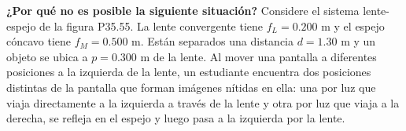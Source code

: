 \item \textbf{¿Por qué no es posible la siguiente situación?}
Considere el sistema lente-espejo de la figura P35.55. La lente convergente tiene $f_L = 0.200\text{ m}$ y el espejo cóncavo tiene $f_M = 0.500\text{ m}$. Están separados una distancia $d = 1.30\text{ m}$ y un objeto se ubica a $p = 0.300\text{ m}$ de la lente. Al mover una pantalla a diferentes posiciones a la izquierda de la lente, un estudiante encuentra dos posiciones distintas de la pantalla que forman imágenes nítidas en ella: una por luz que viaja directamente a la izquierda a través de la lente y otra por luz que viaja a la derecha, se refleja en el espejo y luego pasa a la izquierda por la lente.